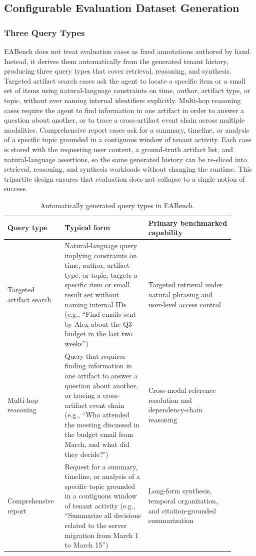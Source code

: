 \subsection{Configurable Evaluation Dataset Generation}
\label{sec:method_evaldataset}

\subsubsection{Three Query Types}

EABench does not treat evaluation cases as fixed annotations authored by hand. Instead, it derives them automatically from the generated tenant history, producing three query types that cover retrieval, reasoning, and synthesis. Targeted artifact search cases ask the agent to locate a specific item or a small set of items using natural-language constraints on time, author, artifact type, or topic, without ever naming internal identifiers explicitly. Multi-hop reasoning cases require the agent to find information in one artifact in order to answer a question about another, or to trace a cross-artifact event chain across multiple modalities. Comprehensive report cases ask for a summary, timeline, or analysis of a specific topic grounded in a contiguous window of tenant activity. Each case is stored with the requesting user context, a ground-truth artifact list, and natural-language assertions, so the same generated history can be re-sliced into retrieval, reasoning, and synthesis workloads without changing the runtime. This tripartite design ensures that evaluation does not collapse to a single notion of success.

\begin{table}[h]
\centering
\caption{Automatically generated query types in EABench.}
\label{tab:query_types}
\small
\begin{tabular}{p{0.21\linewidth}p{0.34\linewidth}p{0.35\linewidth}}
\toprule
\textbf{Query type} & \textbf{Typical form} & \textbf{Primary benchmarked capability} \\
\midrule
Targeted artifact search & Natural-language query implying constraints on time, author, artifact type, or topic; targets a specific item or small result set without naming internal IDs (e.g., ``Find emails sent by Alex about the Q3 budget in the last two weeks'') & Targeted retrieval under natural phrasing and user-level access control \\
Multi-hop reasoning & Query that requires finding information in one artifact to answer a question about another, or tracing a cross-artifact event chain (e.g., ``Who attended the meeting discussed in the budget email from March, and what did they decide?") & Cross-modal reference resolution and dependency-chain reasoning \\
Comprehensive report & Request for a summary, timeline, or analysis of a specific topic grounded in a contiguous window of tenant activity (e.g., ``Summarize all decisions related to the server migration from March 1 to March 15'') & Long-form synthesis, temporal organization, and citation-grounded summarization \\
\bottomrule
\end{tabular}
\end{table}

